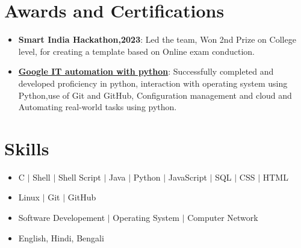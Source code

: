 \documentclass[letterpaper,11pt]{article}
\newcommand{\resumeItem}[1]{
  \item\small{
    {#1 \vspace{-2pt}}
  }
}
\newcommand{\resumeItemListStart}{\begin{itemize}}
\newcommand{\resumeItemListEnd}{\end{itemize}\vspace{-5pt}}
\begin{document}
\section{Awards and Certifications}
 \begin{itemize}[leftmargin=0.15in, label={}]
    \small{\item{
        \resumeItemListStart
            \resumeItem{\textbf{{Smart India Hackathon,2023}}: Led the team, Won 2nd Prize on College level, for creating a template based on Online exam conduction.}
            
      \resumeItemListEnd
      \resumeItemListStart
            \resumeItem{\textbf{\href{https://www.coursera.org/account/accomplishments/professional-cert/XNBDK2NCGTK9}{Google IT automation with python}}: Successfully completed and developed proficiency in python, interaction with operating system using Python,use of Git and GitHub, Configuration management and cloud and Automating real-world tasks using python. }
            
      \resumeItemListEnd
    }}
 \end{itemize}

%

\section{Skills}
    \begin{itemize}[leftmargin=0.15in, label={}]
        \small{\item{
            \resumeItemListStart
                \resumeItem{ C $|$ Shell $|$ Shell Script $|$ Java $|$ Python $|$ JavaScript $|$ SQL $|$ CSS $|$ HTML }
                \resumeItem{ Linux $|$ Git $|$ GitHub }
                \resumeItem{ Software Developement $|$ Operating System $|$ Computer Network }
                \resumeItem{ English, Hindi, Bengali}
            \resumeItemListEnd
        }}
    \end{itemize}
 
\end{document}
